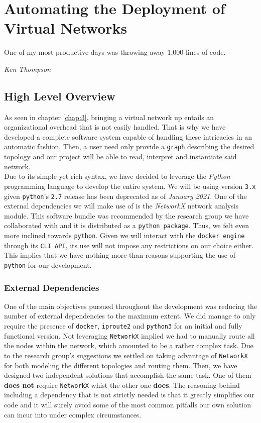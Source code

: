 \chapter{Automating the Deployment of Virtual Networks} \label{chap:4}
    \epigraph{One of my most productive days was throwing away 1,000 lines of code.}{\textit{Ken Thompson}}

    \section{High Level Overview}
        As seen in chapter \ref{chap:3}, bringing a virtual network up entails an organizational overhead that is not easily handled. That is why we have developed a complete software system capable of handling these intricacies in an automatic fashion. Then, a user need only provide a \texttt{graph} describing the desired topology and our project will be able to read, interpret and instantiate said network.\\

        Due to its simple yet rich syntax, we have decided to leverage the \textit{Python} \cite{bib:python} programming language to develop the entire system. We will be using version \texttt{3.x} given \texttt{python}'s \texttt{2.7} release has been deprecated as of \textit{January 2021}. One of the external dependencies we will make use of is the \textit{NetworkX} \cite{bib:networkx} network analysis module. This software bundle was recommended by the research group we have collaborated with and it is distributed as a \texttt{python package}. Thus, we felt even more inclined towards \texttt{python}. Given we will interact with the \texttt{docker engine} through its \texttt{CLI API}, its use will not impose any restrictions on our choice either. This implies that we have nothing more than reasons supporting the use of \texttt{python} for our development.\\

        \subsection{External Dependencies}
            One of the main objectives pursued throughout the development was reducing the number of external dependencies to the maximum extent. We did manage to only require the presence of \texttt{docker}, \texttt{iproute2} and \texttt{python3} for an initial and fully functional version. Not leveraging \texttt{NetworkX} implied we had to manually route all the nodes within the network, which amounted to be a rather complex task. Due to the research group's suggestions we settled on taking advantage of \texttt{NetworkX} for both modeling the different topologies and routing them. Then, we have designed two independent solutions that accomplish the same task. One of them \textbf{does not} require \texttt{NetworkX} whist the other one \textbf{does}. The reasoning behind including a dependency that is not strictly needed is that it greatly simplifies our code and it will surely avoid some of the most common pitfalls our own solution can incur into under complex circumstances.\\

